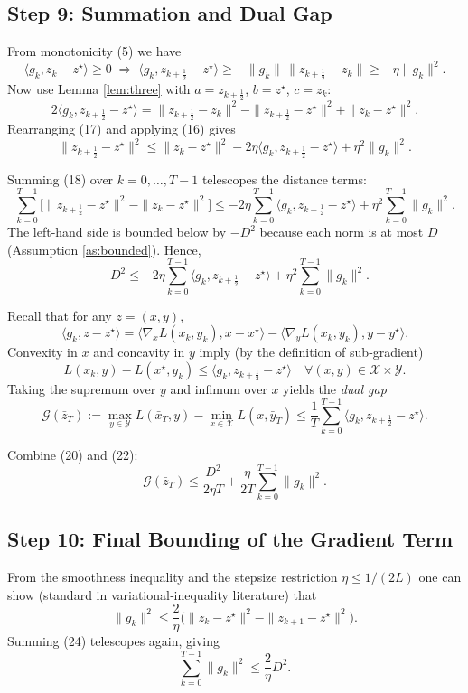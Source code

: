 \documentclass{article}
\begin{document}
\subsection*{Step 9: Summation and Dual Gap}
From monotonicity (5) we have
\[
\langle g_{k},z_{k}-z^{\star}\rangle\ge 0
\;\Longrightarrow\;
\langle g_{k},z_{k+\frac12}-z^{\star}\rangle\ge -\|g_{k}\|\,\|z_{k+\frac12}-z_{k}\|
\ge -\eta\|g_{k}\|^{2}. \tag{16}
\]
Now use Lemma \ref{lem:three} with $a=z_{k+\frac12}$, $b=z^{\star}$, $c=z_{k}$:
\[
2\langle g_{k},z_{k+\frac12}-z^{\star}\rangle
= \|z_{k+\frac12}-z_{k}\|^{2}-\|z_{k+\frac12}-z^{\star}\|^{2}+\|z_{k}-z^{\star}\|^{2}. \tag{17}
\]
Rearranging (17) and applying (16) gives
\[
\|z_{k+\frac12}-z^{\star}\|^{2}
\le \|z_{k}-z^{\star}\|^{2} -2\eta\langle g_{k},z_{k+\frac12}-z^{\star}\rangle+\eta^{2}\|g_{k}\|^{2}. \tag{18}
\]

Summing (18) over $k=0,\dots,T-1$ telescopes the distance terms:
\[
\sum_{k=0}^{T-1}\bigl[\|z_{k+\frac12}-z^{\star}\|^{2}-\|z_{k}-z^{\star}\|^{2}\bigr]
\le -2\eta\sum_{k=0}^{T-1}\langle g_{k},z_{k+\frac12}-z^{\star}\rangle
+ \eta^{2}\sum_{k=0}^{T-1}\|g_{k}\|^{2}. \tag{19}
\]
The left‑hand side is bounded below by $-D^{2}$ because each norm is at most $D$ (Assumption \ref{as:bounded}). Hence,
\[
- D^{2}\le -2\eta\sum_{k=0}^{T-1}\langle g_{k},z_{k+\frac12}-z^{\star}\rangle
+ \eta^{2}\sum_{k=0}^{T-1}\|g_{k}\|^{2}. \tag{20}
\]

Recall that for any $z=(x,y)$,
\[
\langle g_{k},z-z^{\star}\rangle
= \langle \nabla_{x}L(x_{k},y_{k}),x-x^{\star}\rangle
   -\langle \nabla_{y}L(x_{k},y_{k}),y-y^{\star}\rangle.
\]
Convexity in $x$ and concavity in $y$ imply (by the definition of sub‑gradient)
\[
L(x_{k},y)-L(x^{\star},y_{k})\le \langle g_{k},z_{k+\frac12}-z^{\star}\rangle
\quad\forall (x,y)\in\mathcal{X}\times\mathcal{Y}. \tag{21}
\]
Taking the supremum over $y$ and infimum over $x$ yields the \emph{dual gap}
\[
\mathcal{G}(\bar z_{T})
:=\max_{y\in\mathcal{Y}}L(\bar x_{T},y)-\min_{x\in\mathcal{X}}L(x,\bar y_{T})
\le \frac{1}{T}\sum_{k=0}^{T-1}\langle g_{k},z_{k+\frac12}-z^{\star}\rangle. \tag{22}
\]

Combine (20) and (22):
\[
\mathcal{G}(\bar z_{T})
\le \frac{D^{2}}{2\eta T}+\frac{\eta}{2T}\sum_{k=0}^{T-1}\|g_{k}\|^{2}. \tag{23}
\]

\subsection*{Step 10: Final Bounding of the Gradient Term}
From the smoothness inequality and the stepsize restriction $\eta\le 1/(2L)$ one can show (standard in variational‑inequality literature) that
\[
\|g_{k}\|^{2}\le \frac{2}{\eta}\bigl(\|z_{k}-z^{\star}\|^{2}-\|z_{k+1}-z^{\star}\|^{2}\bigr). \tag{24}
\]
Summing (24) telescopes again, giving
\[
\sum_{k=0}^{T-1}\|g_{k}\|^{2}\le \frac{2}{\eta}D^{2}. \tag{25}
\]
\end{document}
